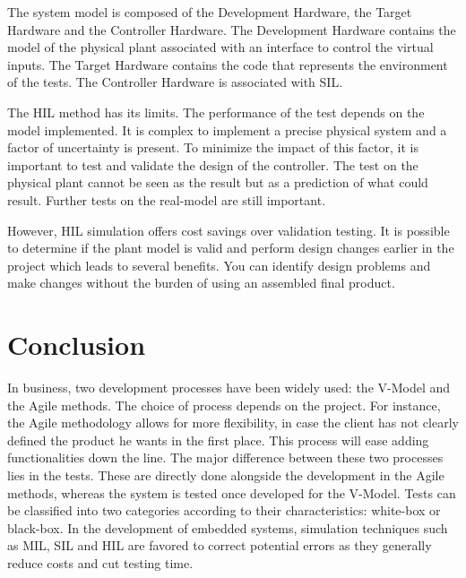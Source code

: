 The system model is composed of the Development Hardware, the Target Hardware and the Controller Hardware. The Development Hardware contains the model of the physical plant associated with an interface to control the virtual inputs. The Target Hardware contains the code that represents the environment of the tests. The Controller Hardware is associated with SIL.\cite{065893}

The HIL method has its limits. The performance of the test depends on the model implemented. It is complex to implement a precise physical system and a factor of uncertainty is present. To minimize the impact of this factor, it is important to test and validate the design of the controller. The test on the physical plant cannot be seen as the result but as a prediction of what could result. Further tests on the real-model are still important.\cite{On-HIL-simu}

However, HIL simulation offers cost savings over validation testing. It is possible to determine if the plant model is valid and perform design changes earlier in the project which leads to several benefits. You can identify design problems and make changes without the burden of using an assembled final product.\cite{065893}





    

\newpage

\section*{Conclusion}


In business, two development processes have been widely used: the V-Model and the Agile methods. The choice of process depends on the project. For instance, the Agile methodology allows for more flexibility, in case the client has not clearly defined the product he wants in the first place. This process will ease adding functionalities down the line. The major difference between these two processes lies in the tests. These are directly done alongside the development in the Agile methods, whereas the system is tested once developed for the V-Model. Tests can be classified into two categories according to their characteristics: white-box or black-box.
In the development of embedded systems, simulation techniques such as MIL, SIL and HIL are favored to correct potential errors as they generally reduce costs and cut testing time.

